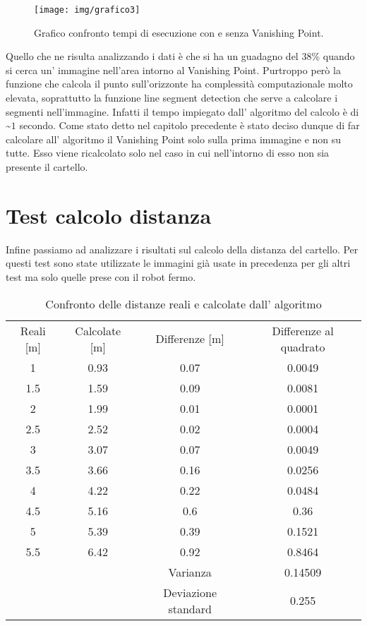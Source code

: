 	\begin{figure}[!ht]
		\centering
		\texttt{[image: img/grafico3]}
		\caption[Grafico tempi di esecuzione]{Grafico confronto tempi di esecuzione con e senza Vanishing Point.}
	\end{figure}

	Quello che ne risulta analizzando i dati è che si ha un guadagno del 38\% quando si cerca un' immagine nell'area intorno al Vanishing Point. Purtroppo però la funzione che calcola il punto sull'orizzonte ha complessità computazionale molto elevata, soprattutto la funzione line segment detection che serve a calcolare i segmenti nell'immagine. Infatti il tempo impiegato dall' algoritmo del calcolo è di \textasciitilde $1$ secondo. Come stato detto nel capitolo precedente è stato deciso dunque di far calcolare all' algoritmo il Vanishing Point solo sulla prima immagine e non su tutte. Esso viene ricalcolato solo nel caso in cui nell'intorno di esso non sia presente il cartello.

\section{Test calcolo distanza}

	Infine passiamo ad analizzare i risultati sul calcolo della distanza del cartello. Per questi test sono state utilizzate le immagini già usate in precedenza per gli altri test ma solo quelle prese con il robot fermo.

	\begin{table}[h]
		\centering
		\begin{tabular}{cccc}
		    Reali [m] & Calcolate [m] & Differenze [m] & Differenze al quadrato \\
			1 	&   0.93	& 0.07		& 0.0049    	\\
			1.5 &   1.59    & 0.09 		& 0.0081 		\\
			2 	& 	1.99	& 0.01		& 0.0001 		\\
			2.5 &   2.52	& 0.02		& 0.0004		\\
			3	&   3.07	& 0.07		& 0.0049		\\
			3.5 &   3.66	& 0.16		& 0.0256		\\
			4 	&   4.22	& 0.22		& 0.0484		\\
			4.5 &   5.16	& 0.6		& 0.36			\\
			5 	&   5.39	& 0.39		& 0.1521		\\
			5.5 &   6.42	& 0.92		& 0.8464		\\
			\hline
			& & Varianza & 0.14509 \\
			& & Deviazione standard & 0.255 \\

		\end{tabular}
		\caption{Confronto delle distanze reali e calcolate dall' algoritmo}
	\end{table}

